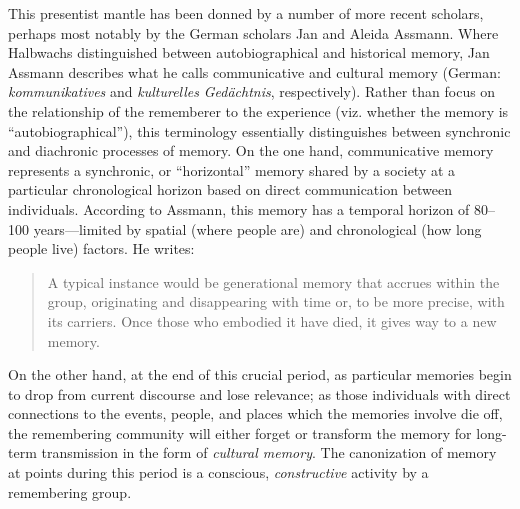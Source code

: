 This presentist mantle has been donned by a number of more recent
scholars, perhaps most notably by the German scholars Jan and Aleida
Assmann.\autocites[See
esp.][]{assmann_nikulin2015}{assmann2011}[and][]{a_assmann2011} Where
Halbwachs distinguished between autobiographical and historical memory,
Jan Assmann describes what he calls communicative and cultural memory
(German: \emph{kommunikatives} and \emph{kulturelles} \emph{Gedächtnis},
respectively).\autocites[36]{assmann2011}[For a concise terminological
crash-course, see][182--183]{hubenthal_carstens-hasselbalch2012} Rather
than focus on the relationship of the rememberer to the experience (viz.
whether the memory is ``autobiographical''), this terminology
essentially distinguishes between synchronic and diachronic processes of
memory. On the one hand, communicative memory represents a synchronic,
or ``horizontal'' memory shared by a society at a particular
chronological horizon based on direct communication between individuals.
According to Assmann, this memory has a temporal horizon of 80--100
years---limited by spatial (where people are) and chronological (how
long people live) factors. He writes:

\begin{quote}
A typical instance would be generational memory that accrues within the
group, originating and disappearing with time or, to be more precise,
with its carriers. Once those who embodied it have died, it gives way to
a new memory.\autocite[36]{assmann2011}
\end{quote}

On the other hand, at the end of this crucial period, as particular
memories begin to drop from current discourse and lose relevance; as
those individuals with direct connections to the events, people, and
places which the memories involve die off, the remembering community
will either forget or transform the memory for long-term transmission in
the form of \emph{cultural memory}. The canonization of memory at points
during this period is a conscious, \emph{constructive} activity by a
remembering group. \autocite[45]{assmann2011}

